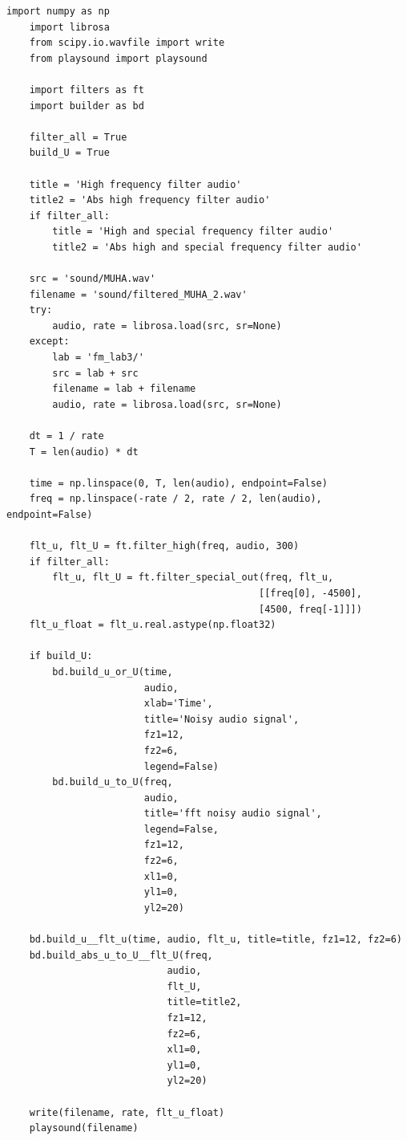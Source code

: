\documentclass[a4paper, 12pt]{article}
\begin{document}
    \begin{lstlisting}[label=l8, caption={Файл audio.py. Фильтрация шумов в аудиозаписи.}]
    import numpy as np
    import librosa
    from scipy.io.wavfile import write
    from playsound import playsound

    import filters as ft
    import builder as bd

    filter_all = True
    build_U = True

    title = 'High frequency filter audio'
    title2 = 'Abs high frequency filter audio'
    if filter_all:
        title = 'High and special frequency filter audio'
        title2 = 'Abs high and special frequency filter audio'

    src = 'sound/MUHA.wav'
    filename = 'sound/filtered_MUHA_2.wav'
    try:
        audio, rate = librosa.load(src, sr=None)
    except:
        lab = 'fm_lab3/'
        src = lab + src
        filename = lab + filename
        audio, rate = librosa.load(src, sr=None)

    dt = 1 / rate
    T = len(audio) * dt

    time = np.linspace(0, T, len(audio), endpoint=False)
    freq = np.linspace(-rate / 2, rate / 2, len(audio), endpoint=False)

    flt_u, flt_U = ft.filter_high(freq, audio, 300)
    if filter_all:
        flt_u, flt_U = ft.filter_special_out(freq, flt_u,
                                            [[freq[0], -4500],
                                            [4500, freq[-1]]])
    flt_u_float = flt_u.real.astype(np.float32)

    if build_U:
        bd.build_u_or_U(time,
                        audio,
                        xlab='Time',
                        title='Noisy audio signal',
                        fz1=12,
                        fz2=6,
                        legend=False)
        bd.build_u_to_U(freq,
                        audio,
                        title='fft noisy audio signal',
                        legend=False,
                        fz1=12,
                        fz2=6,
                        xl1=0,
                        yl1=0,
                        yl2=20)

    bd.build_u__flt_u(time, audio, flt_u, title=title, fz1=12, fz2=6)
    bd.build_abs_u_to_U__flt_U(freq,
                            audio,
                            flt_U,
                            title=title2,
                            fz1=12,
                            fz2=6,
                            xl1=0,
                            yl1=0,
                            yl2=20)

    write(filename, rate, flt_u_float)
    playsound(filename)
    \end{lstlisting}
\end{document}
